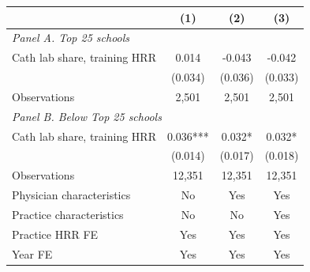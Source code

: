 \begin{tabular}{lccc}
\toprule
 & (1) & (2) & (3) \\
\midrule
\multicolumn{4}{l}{\textit{Panel A. Top 25 schools}} \\
Cath lab share, training HRR & 0.014 & -0.043 & -0.042 \\
 & (0.034) & (0.036) & (0.033) \\
Observations & 2,501 & 2,501 & 2,501 \\
\midrule
\multicolumn{4}{l}{\textit{Panel B. Below Top 25 schools}} \\
Cath lab share, training HRR & 0.036*** & 0.032* & 0.032* \\
 & (0.014) & (0.017) & (0.018) \\
Observations & 12,351 & 12,351 & 12,351 \\
\midrule
Physician characteristics & No & Yes & Yes \\
Practice characteristics & No & No & Yes \\
Practice HRR FE & Yes & Yes & Yes \\
Year FE & Yes & Yes & Yes \\
\bottomrule
\end{tabular}

